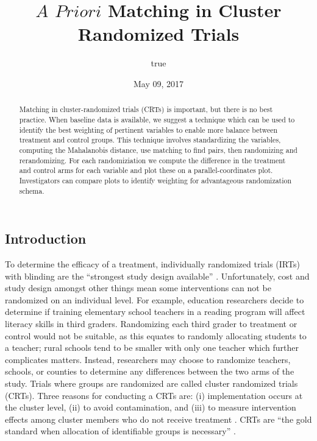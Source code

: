 \documentclass[]{sagej}
\title{\(A\) \(Priori\) Matching in Cluster Randomized Trials}
\author{true}
\date{May 09, 2017}
\begin{document}
\maketitle
\begin{abstract}
Matching in cluster-randomized trials (CRTs) is important, but there is
no best practice. When baseline data is available, we suggest a
technique which can be used to identify the best weighting of pertinent
variables to enable more balance between treatment and control groups.
This technique involves standardizing the variables, computing the
Mahalanobis distance, use matching to find pairs, then randomizing and
rerandomizing. For each randomiziation we compute the difference in the
treatment and control arms for each variable and plot these on a
parallel-coordinates plot. Investigators can compare plots to identify
weighting for advantageous randomization schema.
\end{abstract}

\subsection{Introduction}\label{introduction}

To determine the efficacy of a treatment, individually randomized trials
(IRTs) with blinding are the ``strongest study design available''
\citep{gatsonis2017methods}. Unfortunately, cost and study design
amongst other things mean some interventions can not be randomized on an
individual level. For example, education researchers decide to determine
if training elementary school teachers in a reading program will affect
literacy skills in third graders. Randomizing each third grader to
treatment or control would not be suitable, as this equates to randomly
allocating students to a teacher; rural schools tend to be smaller with
only one teacher which further complicates matters. Instead, researchers
may choose to randomize teachers, schools, or counties to determine any
differences between the two arms of the study. Trials where groups are
randomized are called cluster randomized trials (CRTs). Three reasons
for conducting a CRTs are: (i) implementation occurs at the cluster
level, (ii) to avoid contamination, and (iii) to measure intervention
effects among cluster members who do not receive treatment
\citep{balzer2012match, CRTrials2009}. CRTs are ``the gold standard when
allocation of identifiable groups is necessary''
\citep{murray2004design}.
\end{document}
